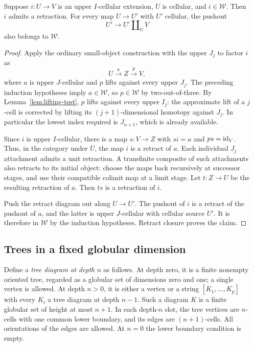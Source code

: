 \begin{lemma}
\label{lem:upper-cell}
Suppose $i:U\to V$ is an upper $I$-cellular extension, $U$ is
cellular, and $i\in\mathcal W$.  Then $i$ admits a retraction.
For every map $U\to U'$ with $U'$ cellular, the pushout
\[
 U'\longrightarrow U'\amalg_U V
\]
also belongs to $\mathcal W$.
\end{lemma}

\begin{proof}
Apply the ordinary small-object construction with the upper
$J_j$ to factor $i$ as
\[
 U\xrightarrow{\,a\,}Z\xrightarrow{\,p\,}V,
\]
where $a$ is upper $J$-cellular and $p$ lifts against every upper
$J_j$.  The preceding induction hypotheses imply $a\in\mathcal W$,
so $p\in\mathcal W$ by two-out-of-three.  By
Lemma~\ref{lem:lifting-test}, $p$ lifts against every upper $I_j$:
the approximate lift of a $j$-cell is corrected by lifting its
$(j+1)$-dimensional homotopy against $J_j$.  In particular the
lowest index required is $J_{n+1}$, which is already available.

Since $i$ is upper $I$-cellular, there is a map $s:V\to Z$ with
$si=a$ and $ps=\mathrm{id}_V$.  Thus, in the category under $U$, the map
$i$ is a retract of $a$.
Each individual $J_j$ attachment admits a unit retraction.  A
transfinite composite of such attachments also retracts to its
initial object: choose the maps back recursively at successor
stages, and use their compatible colimit map at a limit stage.
Let $t:Z\to U$ be the resulting retraction of $a$.  Then $ts$ is
a retraction of $i$.

Push the retract diagram out along $U\to U'$.  The pushout of
$i$ is a retract of the pushout of $a$, and the latter is upper
$J$-cellular with cellular source $U'$.  It is therefore in
$\mathcal W$ by the induction hypotheses.  Retract closure proves
the claim.
\end{proof}

\subsection{Trees in a fixed globular dimension}

Define a \emph{tree diagram at depth $n$} as follows.  At depth zero,
it is a finite nonempty oriented tree, regarded as a globular set
of dimensions zero and one; a single vertex is allowed.  At
depth $n>0$, it is either a vertex or a string
$[K_1,\ldots,K_p]$ with every $K_i$ a tree diagram at depth $n-1$.
Such a diagram $K$ is a finite globular set of height at most
$n+1$.  In each depth-$n$ slot, the tree vertices are $n$-cells
with one common lower boundary, and its edges are $(n+1)$-cells.
All orientations of the edges are allowed.  At $n=0$ the lower
boundary condition is empty.

